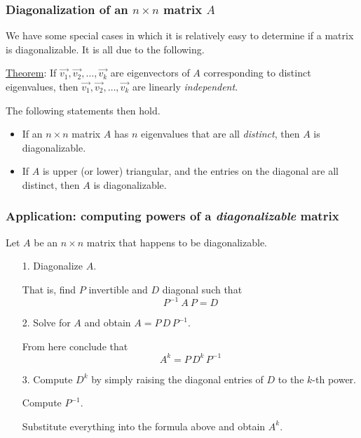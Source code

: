 \documentclass[handout]{beamer}  %
\begin{document}
\begin{frame}
\frametitle{Diagonalization of an $n \times n$ matrix $A$}

We have some special cases in which it is relatively easy to determine if a matrix is diagonalizable. It is all due to the following.

\medskip

\underline{Theorem}:  If $\vec{v_1}, \vec{v_2}, \ldots, \vec{v_k}$ are eigenvectors of $A$ corresponding to \alert{distinct} eigenvalues, then $\vec{v_1}, \vec{v_2}, \ldots, \vec{v_k}$ are linearly {\em independent}. 

\medskip

The following statements then hold.

\begin{itemize}
\item If an \alert{$n \times n$}  matrix $A$ has \alert{$n$} eigenvalues that are all {\em distinct}, then $A$ is diagonalizable. 

\item If $A$ is upper (or lower) triangular, and the entries on the diagonal are all distinct, then $A$ is diagonalizable.

\end{itemize}
\end{frame}


\begin{frame}
\frametitle{Application: computing powers of a {\em diagonalizable} matrix}

Let $A$ be an $n \times n$ matrix that happens to be diagonalizable.

\smallskip

\begin{itemize}
\item[1.] Diagonalize $A$. 

That is, find $P$ invertible and $D$ diagonal such that $$P^{-1} \ A \ P = D$$

\item[2.] Solve for $A$ and obtain $A = P \, D \, P^{-1}$. 

From here conclude that
$$A^k = P \, D^k \, P^{-1}$$

\item[3.] Compute $D^k$ by simply raising the diagonal entries of $D$ to the $k$-th power. 

Compute $P^{-1}$. 

Substitute everything into the formula above and obtain $A^k$. 

\end{itemize}
\end{frame}
\end{document}
